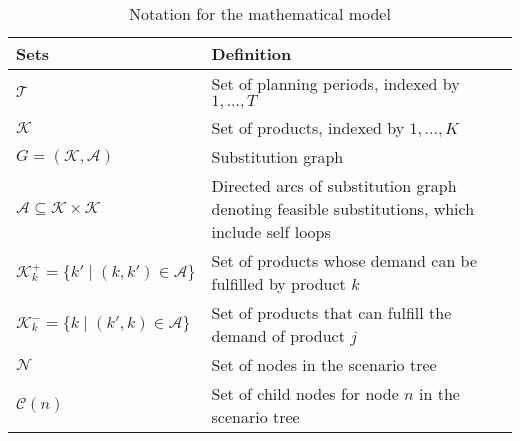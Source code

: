 \documentclass[10pt]{article}
\newcommand{\ti}{t} %
\newcommand{\TI}{\mathcal{T}}
\newcommand{\Ti}{T}
\newcommand{\ka}{k} %
\newcommand{\KA}{\mathcal{K}}
\newcommand{\Ka}{K}
\newcommand{\jey}{j} %
\newcommand{\Graf}{\mathcal{A}} %
\newcommand{\cn}{\mathcal{C}(n) }
\newcommand{\Csub}{\mathcal{K}^+_k}
\newcommand{\Psub}{\mathcal{K}^-_k}
\begin{document}






\begin{table}[H]
\centering
\caption{Notation for the mathematical model}
\begin{adjustbox}{width=1\textwidth,center=\textwidth}
\begin{tabular}{ll}
\toprule
{\textbf {Sets}} & {\textbf {Definition}} \\ \midrule
$\TI$  & Set of planning periods, indexed by $1, ... ,\Ti$ \\ 
$\KA$  & Set of products, indexed by $1, ... ,\Ka$ \\
$ G = (\KA,\mathcal{A})$  & Substitution graph \\
$ \Graf \subseteq \KA \times \KA$  & Directed arcs of substitution graph denoting feasible substitutions, which include self loops
\\
$  \Csub = \{\ka' \mid (\ka,\ka') \in \Graf\}$  & Set of products whose demand can be fulfilled by product $\ka$  \\
$ \Psub = \{\ka \mid (\ka',\ka) \in \Graf\}$  & Set of products that can fulfill the demand of product $\jey$  \\
$ \mathcal{N} $  & Set of nodes in the scenario tree \\
$ \cn $  & Set of child nodes for node $n$ in the scenario tree \\

\end{tabular}
\end{adjustbox}
\end{table}
\end{document}
